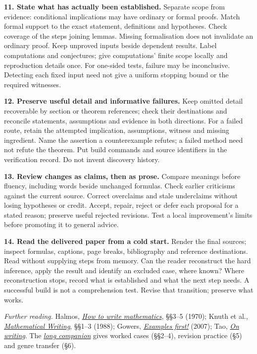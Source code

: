 \documentclass[10pt]{article}
\newcommand{\instruction}[2]{\par\medskip\noindent\textbf{#1.} #2\par}
\begin{document}
\instruction{11. State what has actually been established}{
Separate scope from evidence: conditional implications may have ordinary or
formal proofs. Match formal support to the exact statement, definitions and
hypotheses. Check coverage of the steps joining lemmas. Missing formalisation
does not invalidate an ordinary proof. Keep unproved inputs beside dependent
results. Label computations and conjectures; give computations' finite scope
locally and reproduction details once. For one-sided tests, failure may be inconclusive.
Detecting each fixed input need not give a uniform stopping bound or the
required witnesses.}

\instruction{12. Preserve useful detail and informative failures}{
Keep omitted detail recoverable by section or theorem references; check their
destinations and reconcile statements, assumptions and evidence in both directions.
For a failed route, retain the attempted implication, assumptions, witness and
missing ingredient. Name the assertion a counterexample refutes; a failed method
need not refute the theorem. Put build commands and source identifiers in the
verification record. Do not invent discovery history.}

\instruction{13. Review changes as claims, then as prose}{
Compare meanings before fluency, including words beside unchanged formulas.
Check earlier criticisms against the current source. Correct overclaims and
stale underclaims without losing hypotheses or credit. Accept, repair, reject
or defer each proposal for a stated reason; preserve useful rejected revisions.
Test a local improvement's limits before promoting it to general advice.}

\instruction{14. Read the delivered paper from a cold start}{
Render the final sources; inspect formulas, captions, page breaks, bibliography
and reference destinations. Read without supplying steps from memory. Can the
reader reconstruct the hard inference, apply the result and identify an
excluded case, where known? Where reconstruction stops, record what is
established and what the next step needs. A successful build is not a comprehension test.
Revise that transition; preserve what works.}

\par\medskip\noindent\small
\textit{Further reading.}
Halmos, \href{https://doi.org/10.5169/seals-43857}{\emph{How to write mathematics}}, \S\S3--5 (1970);
Knuth et al., \href{https://cs.stanford.edu/~knuth/klr.html}{\emph{Mathematical Writing}}, \S\S1--3 (1988);
Gowers, \href{https://gowers.wordpress.com/2007/10/19/my-favourite-pedagogical-principle-examples-first/}{\emph{Examples first!}} (2007);
Tao, \href{https://terrytao.wordpress.com/advice-on-writing-papers/}{\emph{On writing}}.
The \href{https://github.com/wcook04/plectis-erdos/blob/main/paper/exposition/writing-mathematics-from-reviewed-revisions.pdf}{\emph{long companion}}
gives worked cases (\S\S2--4), revision practice (\S5) and genre transfer (\S6).
\end{document}
